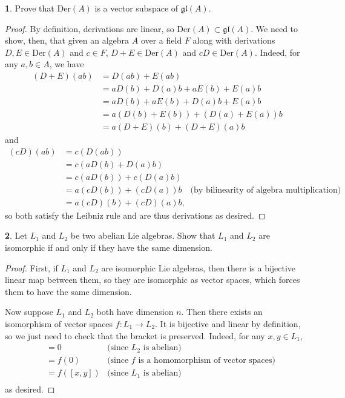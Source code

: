 \documentclass[12pt]{article}
\newcommand{\gl}{\mathfrak{gl}}
\theoremstyle{definition}
\newtheorem{ex}{}
\begin{document}
\begin{ex}
	Prove that $\mathrm{Der}(A)$ is a vector subspace of $\gl(A)$.
\end{ex}
\begin{proof}
	By definition, derivations are linear, so $\mathrm{Der}(A) \subset \gl(A)$.
	We need to show, then, that given an algebra $A$ over a field $F$ along with derivations $D, E \in \mathrm{Der}(A)$ and $c \in F$, $D + E \in \mathrm{Der}(A)$ and $cD \in \mathrm{Der}(A)$.
	Indeed, for any $a, b \in A$, we have \begin{align*}
		(D + E)(ab) & = D(ab) + E(ab)                   \\
		            & = aD(b) + D(a)b + aE(b) + E(a)b   \\
		            & = aD(b) + aE(b) + D(a)b + E(a)b   \\
		            & = a(D(b) + E(b)) + (D(a) + E(a))b \\
		            & = a(D + E)(b) + (D + E)(a)b
	\end{align*}
	and \begin{align*}
		(cD)(ab) & = c(D(ab))                                                                           \\
		         & = c(aD(b) + D(a)b)                                                                   \\
		         & = c(aD(b)) + c(D(a)b)                                                                \\
		         & = a(cD(b)) + (cD(a))b \hspace{1em} \text{(by bilinearity of algebra multiplication)} \\
		         & = a(cD)(b) + (cD)(a)b,
	\end{align*}
	so both satisfy the Leibniz rule and are thus derivations as desired.
\end{proof}

\begin{ex}
	Let $L_1$ and $L_2$ be two abelian Lie algebras.
	Show that $L_1$ and $L_2$ are isomorphic if and only if they have the same dimension.
\end{ex}
\begin{proof}
	First, if $L_1$ and $L_2$ are isomorphic Lie algebras, then there is a bijective linear map between them, so they are isomorphic as vector spaces, which forces them to have the same dimension.

	Now suppose $L_1$ and $L_2$ both have dimension $n$.
	Then there exists an isomorphism of vector spaces $f : L_1 \to L_2$.
	It is bijective and linear by definition, so we just need to check that the bracket is preserved.
	Indeed, for any $x, y \in L_1$, \begin{align*}
		[f(x), f(y)] & = 0         & \text{(since $L_2$ is abelian)}                       \\
		             & = f(0)      & \text{(since $f$ is a homomorphism of vector spaces)} \\
		             & = f([x, y]) & \text{(since $L_1$ is abelian)}                       \\
	\end{align*}
	as desired.
\end{proof}
\end{document}
